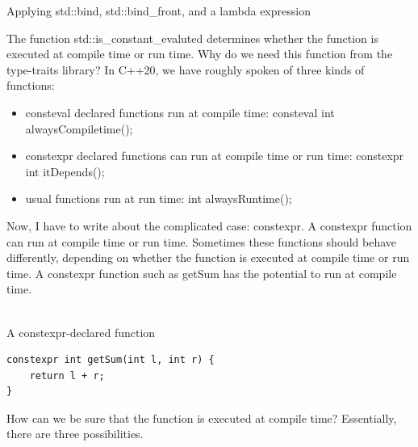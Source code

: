 \begin{center}
Applying std::bind, std::bind\_front, and a lambda expression
\end{center}


The function std::is\_constant\_evaluted determines whether the function is executed at compile time or run time. Why do we need this function from the type-traits library? In C++20, we have roughly spoken of three kinds of functions:

\begin{itemize}
\item 
consteval declared functions run at compile time: consteval int alwaysCompiletime();

\item 
constexpr declared functions can run at compile time or run time: constexpr int itDepends();

\item 
usual functions run at run time: int alwaysRuntime();
\end{itemize}

Now, I have to write about the complicated case: constexpr. A constexpr function can run at compile time or run time. Sometimes these functions should behave differently, depending on whether the function is executed at compile time or run time. A constexpr function such as getSum has the potential to run at compile time.

\hspace*{\fill} \\ %
\noindent
A constexpr-declared function
\begin{lstlisting}[style=styleCXX]
constexpr int getSum(int l, int r) {
	return l + r;
}
\end{lstlisting}

How can we be sure that the function is executed at compile time? Essentially, there are three possibilities.

